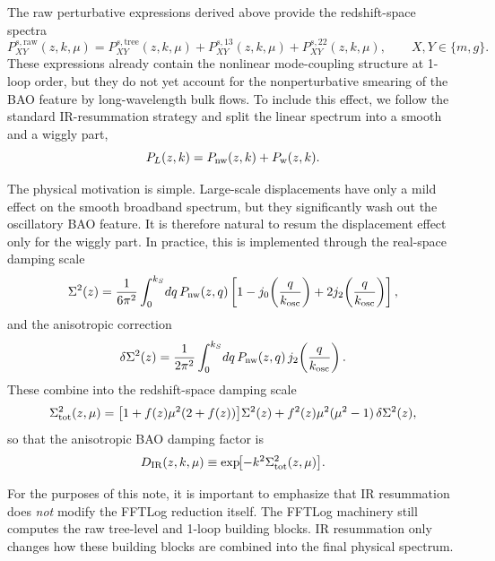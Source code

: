 \documentclass[a4paper,11pt]{article}
\renewcommand{\emph}[1]{\textit{#1}}
\newcommand{\<}{\langle}
\renewcommand{\>}{\rangle}
\begin{document}
The raw perturbative expressions derived above provide the redshift-space spectra
\begin{equation}
P_{XY}^{s,\mathrm{raw}}(z,k,\mu)
=
P_{XY}^{s,\mathrm{tree}}(z,k,\mu)
+
P_{XY}^{s,13}(z,k,\mu)
+
P_{XY}^{s,22}(z,k,\mu),
\qquad X,Y\in\{m,g\}.
\label{eq:PXYs_raw}
\end{equation}
These expressions already contain the nonlinear mode-coupling structure at 1-loop order, but they do not yet account for the nonperturbative smearing of the BAO feature by long-wavelength bulk flows. To include this effect, we follow the standard IR-resummation strategy and split the linear spectrum into a smooth and a wiggly part,
\begin{equation}
P_L(z,k)=P_{\rm nw}(z,k)+P_{\rm w}(z,k).
\label{eq:Plin_split_note}
\end{equation}

The physical motivation is simple. Large-scale displacements have only a mild effect on the smooth broadband spectrum, but they significantly wash out the oscillatory BAO feature. It is therefore natural to resum the displacement effect only for the wiggly part. In practice, this is implemented through the real-space damping scale
\begin{equation}
\Sigma^2(z)
=
\frac{1}{6\pi^2}
\int_0^{k_S}\!dq\,P_{\rm nw}(z,q)
\left[
1-j_0\!\left(\frac{q}{k_{\rm osc}}\right)
+2j_2\!\left(\frac{q}{k_{\rm osc}}\right)
\right],
\label{eq:Sigma2_note}
\end{equation}
and the anisotropic correction
\begin{equation}
\delta\Sigma^2(z)
=
\frac{1}{2\pi^2}
\int_0^{k_S}\!dq\,P_{\rm nw}(z,q)\,
j_2\!\left(\frac{q}{k_{\rm osc}}\right).
\label{eq:dSigma2_note}
\end{equation}
These combine into the redshift-space damping scale
\begin{equation}
\Sigma_{\rm tot}^2(z,\mu)
=
\bigl[1+f(z)\mu^2(2+f(z))\bigr]\Sigma^2(z)
+
f^2(z)\mu^2(\mu^2-1)\,\delta\Sigma^2(z),
\label{eq:SigmaTot_note}
\end{equation}
so that the anisotropic BAO damping factor is
\begin{equation}
D_{\rm IR}(z,k,\mu)
\equiv
\exp\!\bigl[-k^2\Sigma_{\rm tot}^2(z,\mu)\bigr].
\label{eq:DIR_note}
\end{equation}

For the purposes of this note, it is important to emphasize that IR resummation does \emph{not} modify the FFTLog reduction itself. The FFTLog machinery still computes the raw tree-level and 1-loop building blocks. IR resummation only changes how these building blocks are combined into the final physical spectrum.
\end{document}
